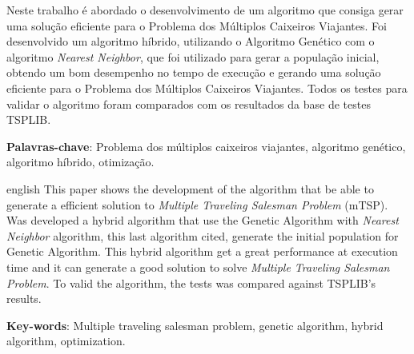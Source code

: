 \documentclass[12pt,openright,a4paper,oneside]{tcc}
\begin{document}

	\imprimircapa
	\imprimirfolhaderosto
	\folhadeaprovacaoteste
    \listoffigures*
    \cleardoublepage
	\tableofcontents
   
	\newpage

	\begin{resumo}
        Neste trabalho é abordado o desenvolvimento de um algoritmo que consiga gerar uma solução eficiente para o Problema dos Múltiplos Caixeiros Viajantes.
        Foi desenvolvido um algoritmo híbrido, utilizando o Algoritmo Genético com o algoritmo \textit{Nearest Neighbor}, que foi utilizado para gerar a população inicial, obtendo um bom desempenho no tempo de execução e gerando uma solução eficiente para o Problema dos Múltiplos Caixeiros Viajantes. Todos os testes para validar o algoritmo foram comparados com os resultados da base de testes TSPLIB. 
        
        \vspace{\onelineskip}
        \noindent
        \textbf{Palavras-chave}: Problema dos múltiplos caixeiros viajantes, algoritmo genético,  algoritmo híbrido, otimização.

	\end{resumo}

	\begin{resumo}[Abstract]
    	\begin{otherlanguage*}{english}
		This paper shows the development of the algorithm that be able to generate a efficient solution to \textit{Multiple Traveling Salesman Problem} (mTSP). Was developed a hybrid algorithm that use the Genetic Algorithm with \textit{Nearest Neighbor} algorithm, this last algorithm cited, generate the initial population for Genetic Algorithm. This hybrid algorithm get a great performance at execution time and it can generate a good solution to solve \textit{Multiple Traveling Salesman Problem}. To valid the algorithm, the tests was compared against TSPLIB's results.

        \vspace{\onelineskip}
        \noindent
        \textbf{Key-words}: Multiple traveling salesman problem, genetic algorithm,  hybrid algorithm, optimization.
		\end{otherlanguage*}
	\end{resumo}
	
\end{document}
